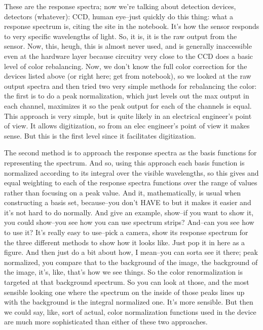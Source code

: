 These are the response spectra; now we're talking about detection devices, detectors (whatever): CCD, human eye--just quickly do this thing: what a response spectrum is, citing the site in the notebook. It's how the sensor responds to very specific wavelengths of light. So, it is, it is the raw output from the sensor. Now, this, heugh, this is almost never used, and is generally inaccessible even at the hardware layer because circuitry very close to the CCD does a basic level of color rebalancing. Now, we don't know the full color correction for the devices listed above (or right here; get from notebook), so we looked at the raw output spectra and then tried two very simple methods for rebalancing the color: the first is to do a peak normalization, which just levels out the max output in each channel, maximizes it so the peak output for each of the channels is equal. This approach is very simple, but is quite likely in an electrical engineer's point of view. It allows digitization, so from an elec engineer's point of view it makes sense. But this is the first level since it facilitates digitization. 

The second method is to approach the response spectra as the basis functions for representing the spectrum. And so, using this approach each basis function is normalized according to its integral over the visible wavelengths, so this gives and equal weighting to each of the response spectra functions over the range of values rather than focusing on a peak value. And it, mathematically, is usual when constructing a basis set, because--you don't HAVE to but it makes it easier and it's not hard to do normally. And give an example, show--if you want to show it, you could show--you see how you can use spectrum strips? And--can you see how to use it? It's really easy to use--pick a camera, show its response spectrum for the three different methods to show how it looks like. Just pop it in here as a figure. And then just do a bit about how, I mean--you can sorta see it there; peak normalized, you compare that to the background of the image, the background of the image, it's, like, that's how we see things. So the color renormalization is targeted at that background spectrum. So you can look at those, and the most sensible looking one where the spectrum on the inside of those peaks lines up with the background is the integral normalized one. It's more sensible. But then we could say, like, sort of actual, color normalization functions used in the device are much more sophisticated than either of these two approaches. 

